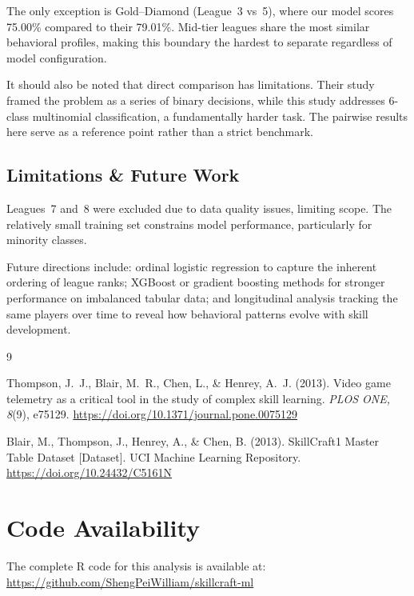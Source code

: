\documentclass[12pt, a4paper]{article}
\begin{document}
The only exception is Gold--Diamond (League~3 vs~5), where our model scores 75.00\%
compared to their 79.01\%. Mid-tier leagues share the most similar behavioral profiles,
making this boundary the hardest to separate regardless of model configuration.

It should also be noted that direct comparison has limitations. Their study framed
the problem as a series of binary decisions, while this study addresses 6-class
multinomial classification, a fundamentally harder task. The pairwise results here
serve as a reference point rather than a strict benchmark.

\subsection{Limitations \& Future Work}

Leagues~7 and~8 were excluded due to data quality issues, limiting scope. The relatively
small training set constrains model performance, particularly for minority classes.

Future directions include: ordinal logistic regression to capture the inherent ordering of
league ranks; XGBoost or gradient boosting methods for stronger performance on imbalanced
tabular data; and longitudinal analysis tracking the same players over time to reveal how
behavioral patterns evolve with skill development.



\begin{thebibliography}{9}

Thompson, J.~J., Blair, M.~R., Chen, L., \& Henrey, A.~J. (2013).
Video game telemetry as a critical tool in the study of complex skill learning.
\textit{PLOS ONE, 8}(9), e75129.
\url{https://doi.org/10.1371/journal.pone.0075129}

Blair, M., Thompson, J., Henrey, A., \& Chen, B. (2013).
SkillCraft1 Master Table Dataset [Dataset].
UCI Machine Learning Repository.
\url{https://doi.org/10.24432/C5161N}

\end{thebibliography}


\appendix
\section{Code Availability}

The complete R code for this analysis is available at:\\
\url{https://github.com/ShengPeiWilliam/skillcraft-ml}
\end{document}
